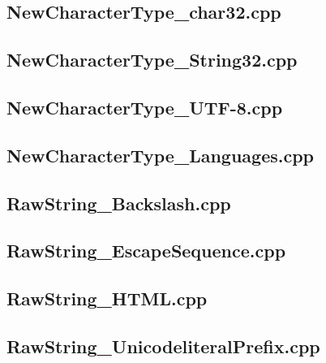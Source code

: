 \documentclass[11pt]{report}
\begin{document}
\begin{appendix}
\subsection{NewCharacterType\_char32.cpp}
\label{NewCharacterType_char32}


\subsection{NewCharacterType\_String32.cpp}
\label{NewCharacterType_String32}


\subsection{NewCharacterType\_UTF-8.cpp}
\label{NewCharacterType_UTF-8}


\subsection{NewCharacterType\_Languages.cpp}
\label{NewCharacterType_Languages}


\subsection{RawString\_Backslash.cpp}
\label{RawString_Backslash}


\subsection{RawString\_EscapeSequence.cpp}
\label{RawString_EscapeSequence}


\subsection{RawString\_HTML.cpp}
\label{RawString_HTML}


\subsection{RawString\_UnicodeliteralPrefix.cpp}
\label{RawString_UnicodeliteralPrefix}



\end{appendix}
\end{document}
